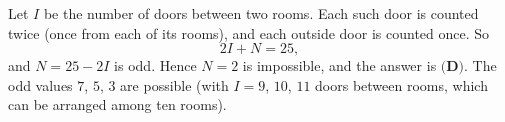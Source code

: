 Let $I$ be the number of doors between two rooms. Each such door is counted twice (once from each of its rooms), and each outside door is counted once. So
\[
2I+N=25 ,
\]
and $N=25-2I$ is odd. Hence $N=2$ is impossible, and the answer is $\boxed{\textbf{(D)}}$. The odd values $7$, $5$, $3$ are possible (with $I=9$, $10$, $11$ doors between rooms, which can be arranged among ten rooms).

